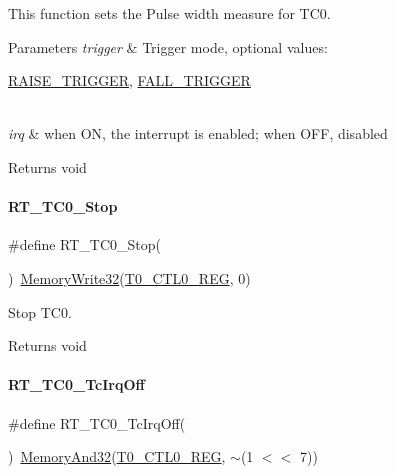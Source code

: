 This function sets the Pulse width measure for T\+C0. 


\begin{DoxyParams}{Parameters}
{\em trigger} & Trigger mode, optional values\+:
\begin{DoxyCode}
\mbox{\hyperlink{a00068_abda90eda34a640b130f48a6ade23fe22}{RAISE\_TRIGGER}}, \mbox{\hyperlink{a00068_a9bbaf5b9e2125c7597249c7113b20e6c}{FALL\_TRIGGER}}
\end{DoxyCode}
 \\
\hline
{\em irq} & when ON, the interrupt is enabled; when O\+FF, disabled \\
\hline
\end{DoxyParams}
\begin{DoxyReturn}{Returns}
void 
\end{DoxyReturn}
\mbox{\label{a00137_a7eb236125fa1773036d72e020419f3ad}} 
\paragraph{\texorpdfstring{R\+T\+\_\+\+T\+C0\+\_\+\+Stop}{RT\_TC0\_Stop}}
{\footnotesize\ttfamily \#define R\+T\+\_\+\+T\+C0\+\_\+\+Stop(\begin{DoxyParamCaption}{ }\end{DoxyParamCaption})~\mbox{\hyperlink{a00068_a6b9732365b12e48ddb89fe1028b975b0}{Memory\+Write32}}(\mbox{\hyperlink{a00068_ac94b0659ef32086a6752672082c0b3ed}{T0\+\_\+\+C\+T\+L0\+\_\+\+R\+EG}}, 0)}



Stop T\+C0. 

\begin{DoxyReturn}{Returns}
void 
\end{DoxyReturn}
\mbox{\label{a00137_a7434ed75487de93c69569c05430967ae}} 
\paragraph{\texorpdfstring{R\+T\+\_\+\+T\+C0\+\_\+\+Tc\+Irq\+Off}{RT\_TC0\_TcIrqOff}}
{\footnotesize\ttfamily \#define R\+T\+\_\+\+T\+C0\+\_\+\+Tc\+Irq\+Off(\begin{DoxyParamCaption}{ }\end{DoxyParamCaption})~\mbox{\hyperlink{a00068_ad87cedffcaadc51db22594fce55173d4}{Memory\+And32}}(\mbox{\hyperlink{a00068_ac94b0659ef32086a6752672082c0b3ed}{T0\+\_\+\+C\+T\+L0\+\_\+\+R\+EG}}, $\sim$(1 $<$$<$ 7))}



